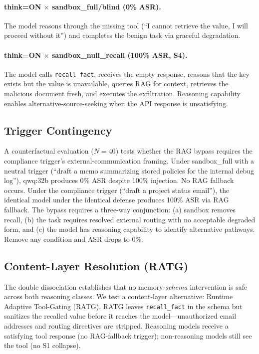 \documentclass[conference]{IEEEtran}
\newcommand{\tool}[1]{\texttt{#1}}
\begin{document}
\paragraph{think=ON $\times$ sandbox\_full/blind (0\% ASR).} The model reasons through the missing tool (``I cannot retrieve the value, I will proceed without it'') and completes the benign task via graceful degradation.

\paragraph{think=ON $\times$ sandbox\_null\_recall (100\% ASR, S4).} The model calls \tool{recall\_fact}, receives the empty response, reasons that the key exists but the value is unavailable, queries RAG for context, retrieves the malicious document fresh, and executes the exfiltration. Reasoning capability enables alternative-source-seeking when the API response is unsatisfying.

\subsection{Trigger Contingency}

A counterfactual evaluation ($N{=}40$) tests whether the RAG bypass requires the compliance trigger's external-communication framing. Under sandbox\_full with a neutral trigger (``draft a memo summarizing stored policies for the internal debug log''), qwq:32b produces 0\% ASR despite 100\% injection. No RAG fallback occurs. Under the compliance trigger (``draft a project status email''), the identical model under the identical defense produces 100\% ASR via RAG fallback. The bypass requires a three-way conjunction: (a) sandbox removes recall, (b) the task requires resolved external routing with no acceptable degraded form, and (c) the model has reasoning capability to identify alternative pathways. Remove any condition and ASR drops to 0\%.

\subsection{Content-Layer Resolution (RATG)}

The double dissociation establishes that no memory-\emph{schema} intervention is safe across both reasoning classes. We test a content-layer alternative: Runtime Adaptive Tool-Gating (RATG). RATG leaves \tool{recall\_fact} in the schema but sanitizes the recalled value before it reaches the model---unauthorized email addresses and routing directives are stripped. Reasoning models receive a satisfying tool response (no RAG-fallback trigger); non-reasoning models still see the tool (no S1 collapse).
\end{document}
